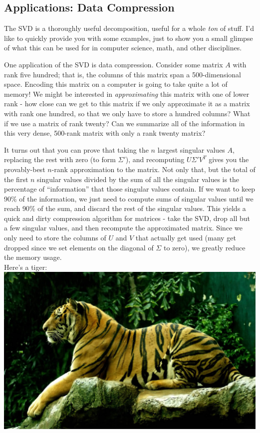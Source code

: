 \documentclass[11pt]{article}
\begin{document}
\subsection*{Applications: Data Compression}

The SVD is a thoroughly useful decomposition, useful for a whole \emph{ton} of stuff. I'd like to
quickly provide you with some examples, just to show you a small glimpse of what this can be used
for in computer science, math, and other disciplines.

One application of the SVD is data compression. Consider some matrix $A$ with rank five hundred; that
is, the columns of this matrix span a 500-dimensional space. Encoding this matrix on a computer is going to take
quite a lot of memory! We might be interested in \emph{approximating} this matrix with one of
lower rank - how close can we get to this matrix if we only approximate it as a matrix with rank one
hundred, so that we only have to store a hundred columns? What if we use a matrix of rank twenty?
Can we summarize all of the information in this very dense, 500-rank matrix with only a rank twenty
matrix?

It turns out that you can prove that taking the $n$ largest singular values $A$, replacing the rest with
zero (to form $\Sigma'$), and recomputing $U\Sigma' V^T$ gives you the provably-best $n$-rank
approximation to the matrix. Not only that, but the total of the first $n$ singular values divided
by the sum of all the singular values is the percentage of ``information'' that those singular
values contain. If we want to keep 90\% of the information, we just need to compute sums of singular
values until we reach 90\% of the sum, and discard the rest of the singular values. This yields a
quick and dirty compression algorithm for matrices - take the SVD, drop all but a few singular
values, and then recompute the approximated matrix. Since we only need to store the columns of $U$
and $V$ that actually get used (many get dropped since we set elements on the diagonal of $\Sigma$
to zero), we greatly reduce the memory usage.\\

\noindent Here's a tiger:\\
\includegraphics[scale=0.3]{images/tiger.jpg}\\
\end{document}
